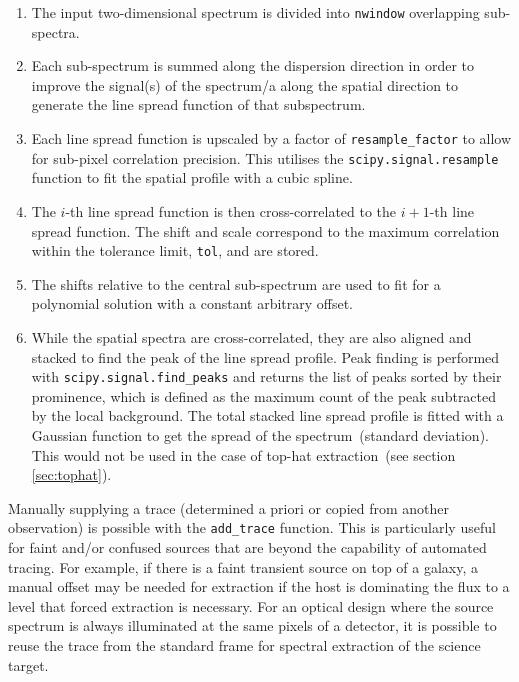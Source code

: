\documentclass[linenumbers, twocolumn]{aastex631}
\begin{document}
\begin{enumerate}
    \item
        The input two-dimensional spectrum is divided into \texttt{nwindow}
        overlapping sub-spectra.
    \item
        Each sub-spectrum is summed along the dispersion direction
        in order to improve the signal(s) of the spectrum/a along
        the spatial direction to generate the line spread function
        of that subspectrum.
    \item
        Each line spread function is upscaled by a factor of
        \texttt{resample\_factor} to allow for sub-pixel correlation
        precision. This utilises the \texttt{scipy.signal.resample}
        function to fit the spatial profile with a cubic spline.
    \item
        The $i$-th line spread function is then cross-correlated to the $i+1$-th
        line spread function. The shift and scale correspond to the maximum
        correlation within the tolerance limit, \texttt{tol}, and are stored.
    \item
        The shifts relative to the central sub-spectrum are used to
        fit for a polynomial solution with a constant arbitrary offset.
    \item
        While the spatial spectra are cross-correlated, they are also
        aligned and stacked to find the peak of the line spread profile.
        Peak finding is performed with \texttt{scipy.signal.find\_peaks}
        and returns the list of peaks sorted by their prominence, which is
        defined as the maximum count of the peak subtracted by the local
        background. The total stacked line spread profile is fitted with
        a Gaussian function to get the spread of the spectrum~(standard
        deviation). This would not be used in the case of top-hat
        extraction~(see section \textsection\ref{sec:tophat}).
\end{enumerate}

Manually supplying a trace (determined a priori or copied from another observation) is possible with the \texttt{add\_trace}
function. This is particularly useful for faint and/or confused
sources that are beyond the capability of automated tracing. For
example, if there is a faint transient source on top of a galaxy,
a manual offset may be needed for extraction if the host is
dominating the flux to a level that forced extraction is necessary.
For an optical design where the source spectrum is always illuminated
at the same pixels of a detector, it is possible to reuse the trace
from the standard frame for spectral extraction of the science target.
\end{document}
